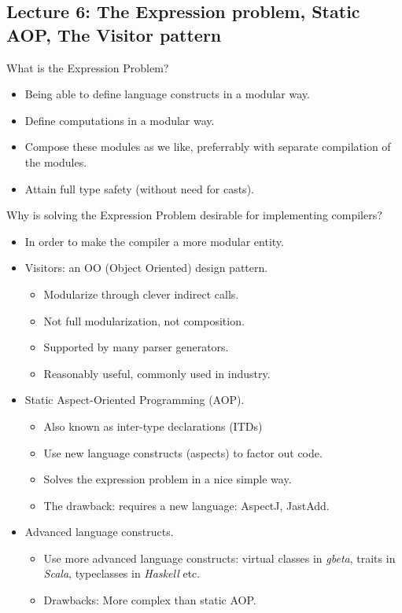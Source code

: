 \documentclass[11pt]{beamer}
\begin{document}
\subsection{Lecture 6: The Expression problem, Static AOP, The Visitor pattern}
\begin{frame}
\begin{block}{What is the Expression Problem? }
\begin{itemize}
\item Being able to define language constructs in a modular way.
\item Define computations in a modular way.
\item Compose these modules as we like, preferrably with separate compilation of the modules.
\item Attain full type safety (without need for casts).
\end{itemize}
\end{block}


\end{frame}


\begin{frame}

\begin{block}{Why is solving the Expression Problem desirable for implementing compilers?}
\begin{itemize}
\item In order to make the compiler a more modular entity.
\item Visitors: an OO (Object Oriented) design pattern.
\begin{itemize}
\item Modularize through clever indirect calls.
\item Not full modularization, not composition.
\item Supported by many parser generators.
\item Reasonably useful, commonly used in industry.
\end{itemize}
\item Static Aspect-Oriented Programming (AOP).
\begin{itemize}
\item Also known as inter-type declarations (ITDs)
\item Use new language constructs (aspects) to factor out code.
\item Solves the expression problem in a nice simple way.
\item The drawback: requires a new language: AspectJ, JastAdd.
\end{itemize}
\item Advanced language constructs.
\begin{itemize}
\item Use more advanced language constructs: virtual classes in \textit{gbeta}, traits in \textit{Scala}, typeclasses in \textit{Haskell} etc.
\item Drawbacks: More complex than static AOP.
\end{itemize}

\end{itemize}
\end{block}

\end{frame}
\end{document}
